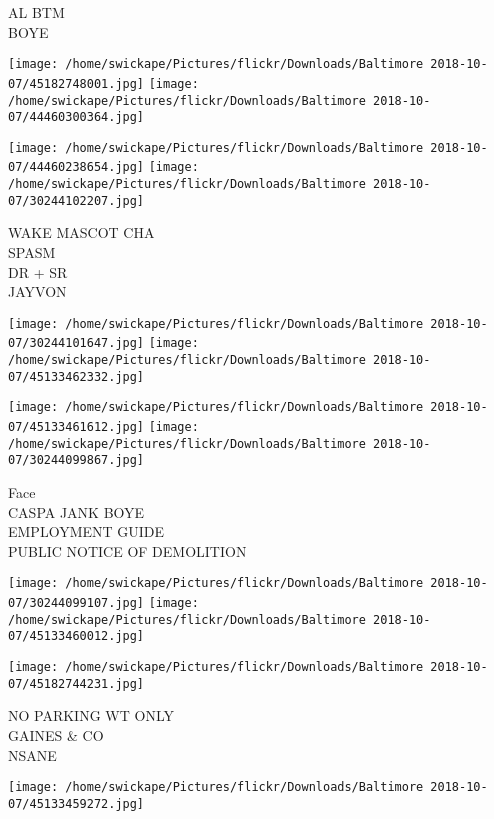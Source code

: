 \documentclass[10pt,letterpaper]{article}
\begin{document}
AL BTM\\
BOYE\\
\pagebreak

\texttt{[image: /home/swickape/Pictures/flickr/Downloads/Baltimore 2018-10-07/45182748001.jpg]}
\texttt{[image: /home/swickape/Pictures/flickr/Downloads/Baltimore 2018-10-07/44460300364.jpg]}

\texttt{[image: /home/swickape/Pictures/flickr/Downloads/Baltimore 2018-10-07/44460238654.jpg]}
\texttt{[image: /home/swickape/Pictures/flickr/Downloads/Baltimore 2018-10-07/30244102207.jpg]}

WAKE MASCOT CHA\\
SPASM\\
DR + SR\\
JAYVON\\
\pagebreak

\texttt{[image: /home/swickape/Pictures/flickr/Downloads/Baltimore 2018-10-07/30244101647.jpg]}
\texttt{[image: /home/swickape/Pictures/flickr/Downloads/Baltimore 2018-10-07/45133462332.jpg]}

\texttt{[image: /home/swickape/Pictures/flickr/Downloads/Baltimore 2018-10-07/45133461612.jpg]}
\texttt{[image: /home/swickape/Pictures/flickr/Downloads/Baltimore 2018-10-07/30244099867.jpg]}

Face\\
CASPA JANK BOYE\\
EMPLOYMENT GUIDE\\
PUBLIC NOTICE OF DEMOLITION\\
\pagebreak

\texttt{[image: /home/swickape/Pictures/flickr/Downloads/Baltimore 2018-10-07/30244099107.jpg]}
\texttt{[image: /home/swickape/Pictures/flickr/Downloads/Baltimore 2018-10-07/45133460012.jpg]}

\vspace{0.25in}
\texttt{[image: /home/swickape/Pictures/flickr/Downloads/Baltimore 2018-10-07/45182744231.jpg]}

NO PARKING WT ONLY\\
GAINES \& CO\\
NSANE\\
\pagebreak

\texttt{[image: /home/swickape/Pictures/flickr/Downloads/Baltimore 2018-10-07/45133459272.jpg]}
\end{document}
